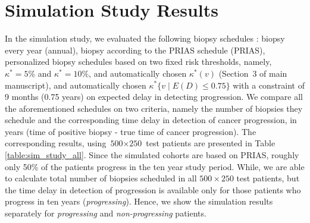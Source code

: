\section{Simulation Study Results}
In the simulation study, we evaluated the following biopsy schedules \citep{loeb2014heterogeneity, inoue2018comparative}: biopsy every year (annual), biopsy according to the PRIAS schedule (PRIAS), personalized biopsy schedules based on two fixed risk thresholds, namely, $\kappa^*=5\%$ and $\kappa^*=10\%$, and automatically chosen $\kappa^*(v)$ (Section~3 of main manuscript), and automatically chosen ${\kappa^*\{v \mid E(D)\leq 0.75\}}$ with a constraint of 9 months (0.75 years) on expected delay in detecting progression. We compare all the aforementioned schedules on two criteria, namely the number of biopsies they schedule and the corresponding time delay in detection of cancer progression, in years (time of positive biopsy - true time of cancer progression). The corresponding results, using ${\mbox{500} \times \mbox{250}}$ test patients are presented in Table \ref{table:sim_study_all}. Since the simulated cohorts are based on PRIAS, roughly only 50\% of the patients progress in the ten year study period. While, we are able to calculate total number of biopsies scheduled in all $500 \times 250$ test patients, but the time delay in detection of progression is available only for those patients who progress in ten years (\textit{progressing}). Hence, we show the simulation results separately for \textit{progressing} and \textit{non-progressing} patients.

